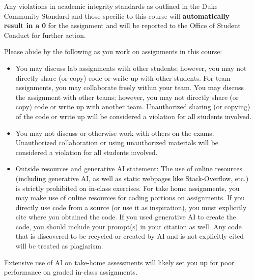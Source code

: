 \documentclass[
  12pt,
  letterpaper,
  DIV=11,
  numbers=noendperiod]{scrartcl}
\begin{document}
Any violations in academic integrity standards as outlined in the Duke
Community Standard and those specific to this course will
\textbf{automatically result in a 0} for the assignment and will be
reported to the Office of Student Conduct for further action.

Please abide by the following as you work on assignments in this course:

\begin{itemize}
\item
  You may discuss lab assignments with other students; however, you may
  not directly share (or copy) code or write up with other students. For
  team assignments, you may collaborate freely within your team. You may
  discuss the assignment with other teams; however, you may not directly
  share (or copy) code or write up with another team. Unauthorized
  sharing (or copying) of the code or write up will be considered a
  violation for all students involved.
\item
  You may not discuss or otherwise work with others on the exams.
  Unauthorized collaboration or using unauthorized materials will be
  considered a violation for all students involved.
\item
  Outside resources and generative AI statement: The use of online
  resources (including generative AI, as well as static webpages like
  Stack-Overflow, etc.) is strictly prohibited on in-class exercises.
  For take home assignments, you may make use of online resources for
  coding portions on assignments. If you directly use code from a source
  (or use it as inspiration), you must explicitly cite where you
  obtained the code. If you used generative AI to create the code, you
  should include your prompt(s) in your citation as well. Any code that
  is discovered to be recycled or created by AI and is not explicitly
  cited will be treated as plagiarism.
\end{itemize}

\begin{tcolorbox}[enhanced jigsaw, colframe=quarto-callout-warning-color-frame, opacitybacktitle=0.6, leftrule=.75mm, toprule=.15mm, colback=white, colbacktitle=quarto-callout-warning-color!10!white, coltitle=black, rightrule=.15mm, opacityback=0, left=2mm, bottomtitle=1mm, toptitle=1mm, titlerule=0mm, title=\textcolor{quarto-callout-warning-color}{\faExclamationTriangle}\hspace{0.5em}{Warning}, breakable, bottomrule=.15mm, arc=.35mm]

Extensive use of AI on take-home assessments will likely set you up for
poor performance on graded in-class assignments.

\end{tcolorbox}
\end{document}
